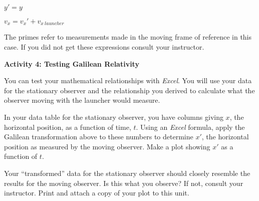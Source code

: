 {\centering \( y'=y \)\par}

{\centering \( v_{x}=v_{x}'+v_{x\ launcher} \)\par}

The primes refer to measurements made in the moving frame of reference
in this case. If you did not get these expressions consult your instructor.

\textbf{Activity 4: Testing Galilean Relativity}

You can test your mathematical relationships with 
\emph{Excel}. You will use your data for the stationary
observer and the relationship you derived to calculate what the observer
moving with the launcher would measure.

In your data table for the stationary observer, you have
columns giving $x$, the horizontal position, as a function
of time, $t$.  Using an \textit{Excel} formula, apply the 
Galilean transformation above to these numbers to determine
$x'$, the horizontal position as measured by the moving observer.
Make a plot showing $x'$ as a function of $t$.

Your {}``transformed'' data for the stationary observer should
closely resemble the results for the moving observer. Is this what
you observe? If not, consult your instructor. Print and attach a copy
of your plot to this unit.
